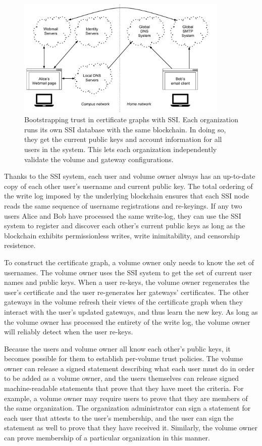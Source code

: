 \begin{figure}[h!]
   \centering
   \includegraphics[width=0.9\textwidth,page=15]{figures/dissertation-figures}
   \caption{Bootstrapping trust in certificate graphs with SSI.  Each
   organization runs its own SSI database with the same blockchain.  In doing
   so, they get the current public keys and account information for all users in
   the system.  This lets each organization independently validate the volume
   and gateway configurations.}
   \label{fig:chap2-ssi-system-with-volumes}
\end{figure}

Thanks to the SSI system, each user and volume owner always has an up-to-date
copy of each other user's username and current public key.  The total ordering
of the write log imposed by the underlying blockchain
ensures that each SSI node reads the same sequence of
username registrations and re-keyings.  If any two users Alice and Bob have
processed the same write-log, they can use the SSI system to register and
discover each other's current public keys as long as the blockchain exhibits
permissionless writes, write inimitability, and censorship resistence. 

To construct the certificate graph, a volume owner only needs to know the set of
usernames.  The volume owner uses the SSI system to get the set of current
user names and public keys.  When a user re-keys, the volume owner regenerates the user's
certificate and the user re-generates her gateways' certificates.  The other
gateways in the volume refresh their views of the certificate graph when they
interact with the user's updated gateways, and thus learn the new key.
As long as the volume owner has
processed the entirety of the write log, the volume owner will reliably detect
when the user re-keys.

Because the users and volume owner all know each other's public keys, it becomes
possible for them to establish per-volume trust policies.  The volume owner
can release a signed statement describing what each user must do in order to be
added as a volume owner, and the users themselves can release signed
machine-readable statements that prove that they have meet the criteria.  For example, a volume owner may
require users to prove that they are members of the same organization.  The
organization administrator can sign a statement for each user that attests to the user's
membership, and the user can sign the statement as well to prove that they have
received it.  Similarly, the volume owner can prove membership of a particular
organization in this manner.

